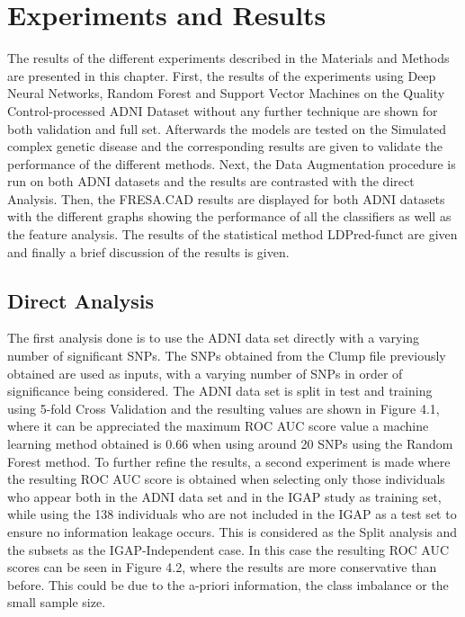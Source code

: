 \chapter{Experiments and Results} \label{results}

The results of the different experiments described in the Materials and Methods are presented in this chapter. First, the results of the experiments using Deep Neural Networks, Random Forest and Support Vector Machines on the Quality Control-processed ADNI Dataset without any further technique are shown for both validation and full set. Afterwards the models are tested on the Simulated complex genetic disease and the corresponding results are given to validate the performance of the different methods. Next, the Data Augmentation procedure is run on both ADNI datasets and the results are contrasted with the direct Analysis. Then, the FRESA.CAD results are displayed for both ADNI datasets with the different graphs showing the performance of all the classifiers as well as the feature analysis. The results of the statistical method LDPred-funct are given and finally a brief discussion of the results is given.

 \section{Direct Analysis}
The first analysis done is to use the ADNI data set directly with a varying number of significant SNPs. The SNPs obtained from the Clump file previously obtained are used as inputs, with a varying number of SNPs in order of significance being considered. The ADNI data set is split in test and training using 5-fold Cross Validation and the resulting values are shown in Figure 4.1, where it can be appreciated the maximum ROC AUC score value a machine learning method obtained is  0.66 when using around 20 SNPs using the Random Forest method.  
\newpage
To further refine the results, a second experiment is made where the resulting ROC AUC score is obtained when selecting only those individuals who appear both in the ADNI data set and in the IGAP study as training set, while using the 138 individuals who are not included in the IGAP as a test set to ensure no information leakage occurs. This is considered as the Split analysis and the subsets as the IGAP-Independent case. In this case the resulting ROC AUC scores can be seen in Figure 4.2, where the results are more conservative than before. This could be due to the a-priori information, the class imbalance or the small sample size.


